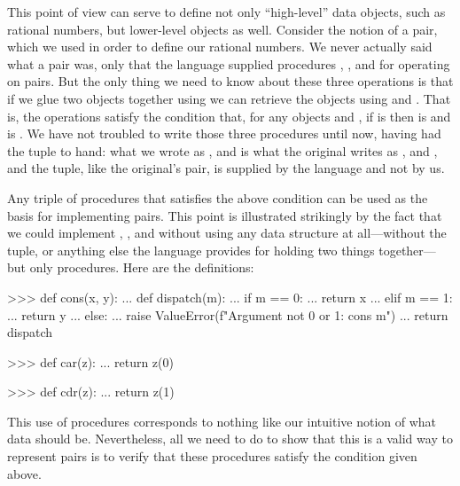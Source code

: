 This point of view can serve to define not only ``high-level'' data objects,
such as rational numbers, but lower-level objects as well.  Consider the notion
of a pair, which we used in order to define our rational numbers.  We never
actually said what a pair was, only that the language supplied procedures
, , and  for operating on pairs.  But the only
thing we need to know about these three operations is that if we glue two
objects together using  we can retrieve the objects using 
and .  That is, the operations satisfy the condition that, for any
objects  and , if  is  then
 is  and  is .  We have not troubled
to write those three procedures until now, having had the tuple to hand: what
we wrote as ,  and  is what the original
writes as ,  and , and the tuple, like the
original's pair, is supplied by the language and not by us.

Any triple of procedures that satisfies the above condition can be used as the
basis for implementing pairs.  This point is illustrated strikingly by the fact
that we could implement , , and  without using
any data structure at all---without the tuple, or anything else the language
provides for holding two things together---but only procedures.  Here are the
definitions:

\begin{codeBlock}
>>> def cons(x, y):
...     def dispatch(m):
...         if m == 0:
...             return x
...         elif m == 1:
...             return y
...         else:
...             raise ValueError(f"Argument not 0 or 1: cons {m}")
...     return dispatch

>>> def car(z):
...     return z(0)

>>> def cdr(z):
...     return z(1)
\end{codeBlock}

\noindent
This use of procedures corresponds to nothing like our intuitive notion of what
data should be.  Nevertheless, all we need to do to show that this is a valid
way to represent pairs is to verify that these procedures satisfy the condition
given above.

